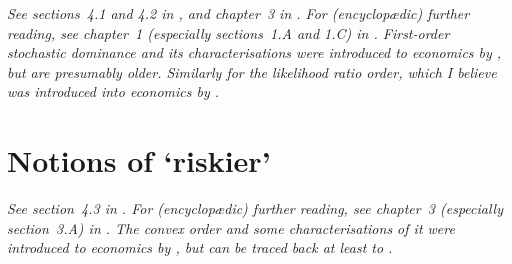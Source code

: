 \emph{See sections~4.1 and 4.2 in \textcite{Sarver2023}, and chapter~3 in \textcite{Liang2023}. For (encyclopædic) further reading, see chapter~1 (especially sections~1.A and 1.C) in \textcite{ShakedShanthikumar2007}. First-order stochastic dominance and its characterisations were introduced to economics by \textcite{HadarRussell1969,HanochLevy1969}, but are presumably older. Similarly for the likelihood ratio order, which I believe was introduced into economics by \textcite{Milgrom1981}.}




\section[Notions of \texorpdfstring{`riskier'}{'riskier'} \emph{(not yet written)}]{Notions of `riskier'}
\label{mone:stoch_risk}

\emph{See section~4.3 in \textcite{Sarver2023}. For (encyclopædic) further reading, see chapter~3 (especially section~3.A) in \textcite{ShakedShanthikumar2007}. The convex order and some characterisations of it were introduced to economics by \textcite{RotschildStiglitz1970}, but can be traced back at least to \textcite{HardyLittlewoodPolya1929,HardyLittlewoodPolya1934}.}

